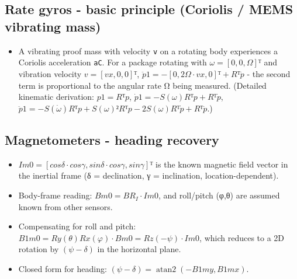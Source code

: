 \documentclass[11pt]{article}
\begin{document}
\subsection{Rate gyros - basic principle (Coriolis / MEMS vibrating mass)}
\begin{itemize}
\item A vibrating proof mass with velocity \texttt{v} on a rotating body experiences a Coriolis acceleration \texttt{aC}. For a package rotating with $ω = [0,0,Ω]ᵀ$ and vibration velocity $v = [vx,0,0]ᵀ$, $\ddot{p}1 = -[0, 2Ω·vx, 0]ᵀ + Rᵀ\ddot{p}$ - the second term is proportional to the angular rate Ω being measured. (Detailed kinematic derivation: $p1 = Rᵀp$, $\dot{p}1 = -S(ω)Rᵀp + Rᵀ\dot{p}$, $\ddot{p}1 = -S(\dot{ω})Rᵀp + S(ω)²Rᵀp - 2S(ω)Rᵀ\dot{p} + Rᵀ\ddot{p}$.)
\end{itemize}

\subsection{Magnetometers - heading recovery}
\begin{itemize}
\item $Im0 = [cosδ·cosγ, sinδ·cosγ, sinγ]ᵀ$ is the known magnetic field vector in the inertial frame (δ = declination, γ = inclination, location-dependent).
\item Body-frame reading: $Bm0 = BR_I · Im0$, and roll/pitch (φ,θ) are assumed known from other sensors.
\item Compensating for roll and pitch: $B1m0 = Ry(θ)Rx(φ)·Bm0 = Rz(-ψ)·Im0$, which reduces to a 2D rotation by $(ψ-δ)$ in the horizontal plane.
\item Closed form for heading: $(ψ - δ) = \operatorname{atan2}(-B1my, B1mx)$.
\end{itemize}
\end{document}
